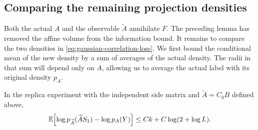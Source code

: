\subsection{Comparing the remaining projection densities}

Both the actual $A$ and the observable $\widetilde A$ annihilate $F$.
The preceding lemma has removed the affine volume from the information
bound. It remains to compare the two densities in
\eqref{eq:gaussian-correlation-loss}. We first bound the conditional mean
of the new density by a sum of averages of the actual density. The radii
in that sum will depend only on $A$, allowing us to average the actual
label with its original density $p_A$.

\begin{lemma}\label{lem:gaussian-density}
In the replica experiment with the independent side matrix and
$\widetilde A=C_0B$ defined above,
\begin{equation}\label{eq:gaussian-density-comparison}
 \mathbb E\!\left[\log p_{\widetilde A}(\widetilde A S_1)-\log p_A(Y)\right]
 \le Ck+C\log(2+\log L).
\end{equation}
\end{lemma}

